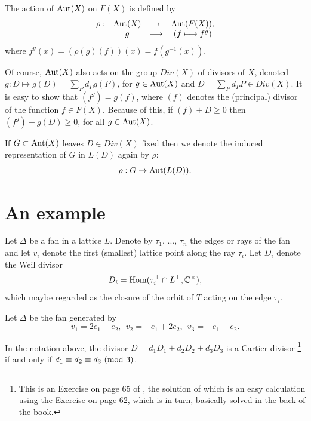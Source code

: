 \documentclass[12pt]{article}
\def\ccc{\mathbb{C}}
\begin{document}
The action of ${\rm Aut}(X)$ on $F(X)$ is 
defined by 
\[
\begin{array}{cccc}
\rho:&{\rm Aut}(X)&\rightarrow &{\rm Aut}(F(X)),\\
 & g &\longmapsto & (f\longmapsto f^g)
\end{array}
\]
where $f^g(x)=(\rho(g)(f))(x)=f(g^{-1}(x))$.

Of course, ${\rm Aut}(X)$ also acts on the group $Div(X)$ of
divisors of $X$, denoted $g:D\longmapsto g(D)=\sum_P d_Pg(P)$,
for $g\in {\rm Aut}(X)$ and $D=\sum_P d_P P\in Div(X)$.
It is easy to show that $(f^g)=g(f)$, where
$(f)$ denotes the (principal) divisor of the function
$f\in F(X)$. Because of this, if $(f)+D\geq 0$
then $(f^g)+g(D)\geq 0$, for all $g\in {\rm Aut}(X)$.

If $G\subset {\rm Aut}(X)$ leaves $D\in Div(X)$ fixed then we denote
the induced representation of $G$ in $L(D)$ again
by $\rho$:
\[
\rho:G\rightarrow {\rm Aut}(L(D)).
\]

\section{An example}
\label{sec:example}

Let $\Delta$ be a fan in a lattice $L$. Denote by
$\tau_1$, ..., $\tau_n$ the edges or rays of
the fan and let $v_i$ denote the first (smallest)
lattice point along the ray $\tau_i$.
Let $D_i$ denote the Weil divisor 
\[
D_i={\rm Hom}(\tau_i^\perp\cap L^\perp,\ccc^\times),
\]
which maybe regarded as the closure of the orbit of $T$ acting on 
the edge $\tau_i$. 

Let $\Delta$ be the fan generated by 
\[
v_1=2e_1-e_2,\ \ v_2=-e_1+2e_2,\ \ v_3=-e_1-e_2.
\]

In the notation above, the divisor $D=d_1D_1+d_2D_2+d_3D_3$
is a Cartier divisor
\footnote{This is an Exercise on page 65 of \cite{F},
the solution of which is an easy calculation using the
Exercise on page 62, which is in turn, basically
solved in the back of the book.}
if and only if
$d_1\equiv d_2\equiv d_3\ ({\rm mod}\ 3)$.
\end{document}
